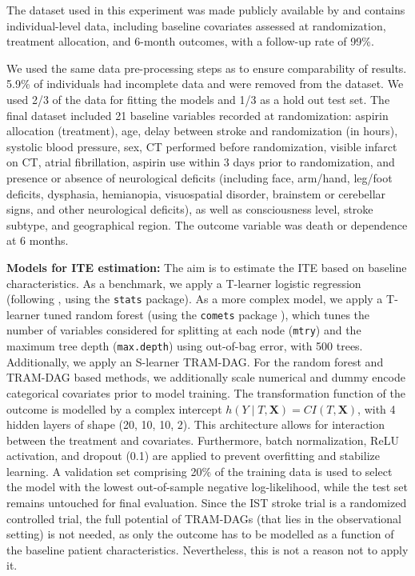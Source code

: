 The dataset used in this experiment was made publicly available by \citet{sandercock2011} and contains individual-level data, including baseline covariates assessed at randomization, treatment allocation, and 6-month outcomes, with a follow-up rate of 99\%.

We used the same data pre-processing steps as \citet{chen2025} to ensure comparability of results. 5.9\% of individuals had incomplete data and were removed from the dataset. We used 2/3 of the data for fitting the models and 1/3 as a hold out test set. The final dataset included 21 baseline variables recorded at randomization: aspirin allocation (treatment), age, delay between stroke and randomization (in hours), systolic blood pressure, sex, CT performed before randomization, visible infarct on CT, atrial fibrillation, aspirin use within 3 days prior to randomization, and presence or absence of neurological deficits (including face, arm/hand, leg/foot deficits, dysphasia, hemianopia, visuospatial disorder, brainstem or cerebellar signs, and other neurological deficits), as well as consciousness level, stroke subtype, and geographical region. The outcome variable was death or dependence at 6 months.


\medskip

\textbf{Models for ITE estimation: } The aim is to estimate the ITE based on baseline characteristics. As a benchmark, we apply a T-learner logistic regression (following \citet{chen2025}, using the \texttt{stats} package). As a more complex model, we apply a T-learner tuned random forest (using the \texttt{comets} package \citep{comets}), which tunes the number of variables considered for splitting at each node (\texttt{mtry}) and the maximum tree depth (\texttt{max.depth}) using out-of-bag error, with 500 trees. Additionally, we apply an S-learner TRAM-DAG. For the random forest and TRAM-DAG based methods, we additionally scale numerical and dummy encode categorical covariates prior to model training. The transformation function of the outcome is modelled by a complex intercept $h(Y \mid T, \mathbf{X}) = CI(T, \mathbf{X})$, with 4 hidden layers of shape (20, 10, 10, 2). This architecture allows for interaction between the treatment and covariates. Furthermore, batch normalization, ReLU activation, and dropout (0.1) are applied to prevent overfitting and stabilize learning. A validation set comprising 20\% of the training data is used to select the model with the lowest out-of-sample negative log-likelihood, while the test set remains untouched for final evaluation. Since the IST stroke trial is a randomized controlled trial, the full potential of TRAM-DAGs (that lies in the observational setting) is not needed, as only the outcome has to be modelled as a function of the baseline patient characteristics. Nevertheless, this is not a reason not to apply it.


